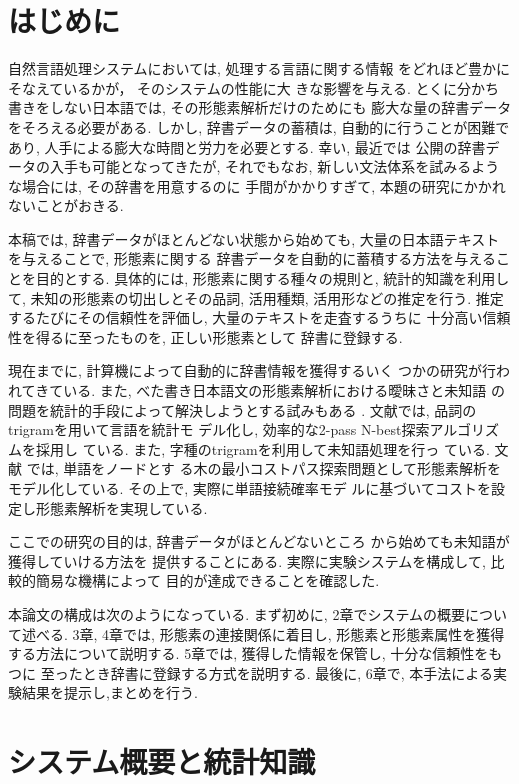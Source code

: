 \section{はじめに}
\label{sec1}
自然言語処理システムにおいては, 処理する言語に関する情報
をどれほど豊かにそなえているかが，
そのシステムの性能に大
きな影響を与える. 
とくに分かち書きをしない日本語では, その形態素解析だけのためにも
 膨大な量の辞書データをそろえる必要がある.
しかし, 辞書データの蓄積は, 自動的に行うことが困難であり, 
人手による膨大な時間と労力を必要とする. 幸い, 最近では
公開の辞書データの入手も可能となってきたが, それでもなお, 
新しい文法体系を試みるような場合には, その辞書を用意するのに
手間がかかりすぎて, 本題の研究にかかれないことがおきる.  

本稿では, 辞書データがほとんどない状態から始めても, 
大量の日本語テキストを与えることで, 形態素に関する
辞書データを自動的に蓄積する方法を与えることを目的とする.  
具体的には, 形態素に関する種々の規則と, 統計的知識を利用して, 
未知の形態素の切出しとその品詞, 活用種類, 活用形などの推定を行う.  
推定するたびにその信頼性を評価し, 大量のテキストを走査するうちに
十分高い信頼性を得るに至ったものを, 正しい形態素として
辞書に登録する.  

現在までに, 計算機によって自動的に辞書情報を獲得するいく
つかの研究が行われてきている\cite{Kokuritu,Suzuki}. 
また, べた書き日本語文の形態素解析における曖昧さと未知語
の問題を統計的手段によって解決しようとする試みもある
\cite{Nagata,Simomura}. 
文献\cite{Nagata}では, 品詞のtrigramを用いて言語を統計モ
デル化し, 効率的な2-pass N-best探索アルゴリズムを採用し
ている. また, 字種のtrigramを利用して未知語処理を行っ
ている.
文献 \cite{Simomura}では, 単語をノードとす
る木の最小コストパス探索問題として形態素解析をモデル化している. 
その上で, 実際に単語接続確率モデ
ルに基づいてコストを設定し形態素解析を実現している.


ここでの研究の目的は, 
辞書データがほとんどないところ
から始めても未知語が獲得していける方法を
提供することにある.  
実際に実験システムを構成して, 比較的簡易な機構によって
目的が達成できることを確認した.  

本論文の構成は次のようになっている. 
まず初めに, 2章でシステムの概要について述べる. 
3章, 4章では, 形態素の連接関係に着目し, 
形態素と形態素属性を獲得する方法について説明する. 
5章では, 獲得した情報を保管し, 十分な信頼性をもつに
至ったとき辞書に登録する方式を説明する.  
 最後に, 6章で, 本手法による実験結果を提示し,まとめを行う.

\section{システム概要と統計知識}
